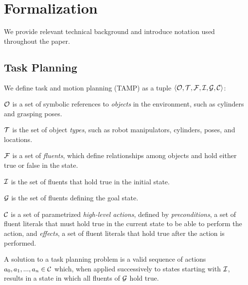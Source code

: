 \section{Formalization}
We provide relevant technical background and introduce notation
used throughout the paper.

\subsection{Task Planning}
We define task and motion planning (TAMP) as a tuple $\langle \mathcal{O}, \mathcal{T}, \mathcal{F}, \mathcal{I}, \mathcal{G}, \mathcal{C} \rangle$:
\begin{tightlist}
\item $\mathcal{O}$ is a set of symbolic references to \emph{objects} in the environment,
such as cylinders and grasping poses.
\item $\mathcal{T}$ is the set of object \emph{types}, such as robot manipulators, cylinders, poses, and locations.
\item $\mathcal{F}$ is a set of \emph{fluents}, which define relationships among objects and hold either
true or false in the state.
\item $\mathcal{I}$ is the set of fluents that hold true in the initial state.
\item $\mathcal{G}$ is the set of fluents defining the goal state.
\item $\mathcal{C}$ is a set of parametrized \emph{high-level actions}, defined by \emph{preconditions}, a set
of fluent literals that must hold true in the current state to be able to perform the action,
and \emph{effects}, a set of fluent literals that hold true after the action is performed.
\end{tightlist}
A solution to a task planning problem is a valid sequence of actions
$a_{0}, a_{1}, ..., a_{n} \in \mathcal{C}$ which, when applied successively to states
starting with $\mathcal{I}$, results in a state in which all fluents of $\mathcal{G}$ hold true.



